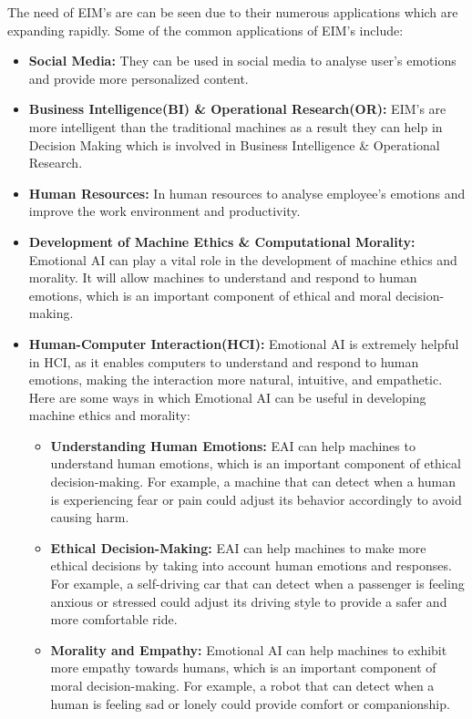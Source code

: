 The need of EIM's are can be seen due to their numerous applications which are expanding rapidly.
Some of the common applications of EIM's include:
\begin{itemize}
	\item \textbf{Social Media:} They can be used in social media to analyse user's emotions and provide more personalized content.
	\item \textbf{Business Intelligence(BI) \& Operational Research(OR):} EIM's are more intelligent than the traditional machines as a result they can help in Decision Making which is involved in Business Intelligence \& Operational Research.
	\item \textbf{Human Resources:} In human resources to analyse employee's emotions and improve the work environment and productivity.
	\item \textbf{Development of Machine Ethics \& Computational Morality:} Emotional AI can play a vital role in the development of machine ethics and morality. It will allow machines to understand and respond to human emotions, which is an important component of ethical and moral decision-making.
	\item \textbf{Human-Computer Interaction(HCI):} Emotional AI is extremely helpful in HCI, as it enables computers to understand and respond to human emotions, making the interaction more natural, intuitive, and empathetic. Here are some ways in which Emotional AI can be useful in developing machine ethics and morality:
	\begin{itemize}
		\item \textbf{Understanding Human Emotions:} EAI can help machines to understand human emotions, which is an important component of ethical decision-making. For example, a machine that can detect when a human is experiencing fear or pain could adjust its behavior accordingly to avoid causing harm.
		\item \textbf{Ethical Decision-Making:} EAI can help machines to make more ethical decisions by taking into account human emotions and responses. For example, a self-driving car that can detect when a passenger is feeling anxious or stressed could adjust its driving style to provide a safer and more comfortable ride.
		\item \textbf{Morality and Empathy:} Emotional AI can help machines to exhibit more empathy towards humans, which is an important component of moral decision-making. For example, a robot that can detect when a human is feeling sad or lonely could provide comfort or companionship.

\end{itemize}
\end{itemize}
